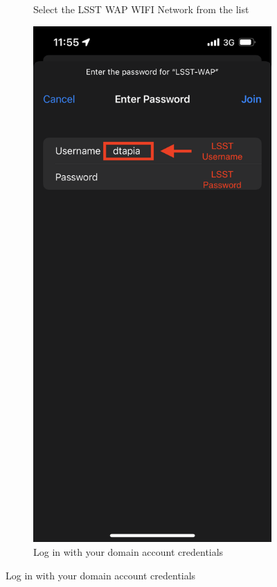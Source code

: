 \begin{figure}
\begin{subfigure}{0.30\textwidth}
      \caption*{Select the LSST WAP WIFI Network from the list}  
    \end{subfigure}
      \hfill
    \begin{subfigure}{0.30\textwidth}
      \includegraphics[width=\textwidth]{Images/ios2.png}
      \caption*{Log in with your domain account credentials}
      \hfill
    \end{subfigure}  
  \end{figure} 
